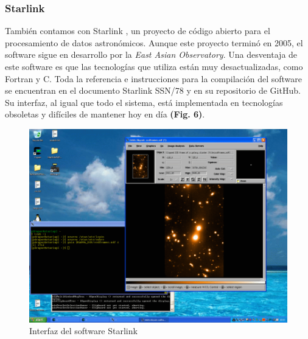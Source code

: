 \documentclass[10pt,twocolumn,a4paper]{opticajnl}
\begin{document}
\subsubsection*{Starlink}
También contamos con Starlink \cite{Berry_Starlink}, un proyecto de código abierto para el procesamiento de datos astronómicos. Aunque este proyecto terminó en 2005, el software sigue en desarrollo por la \textit{East Asian Observatory}. Una desventaja de este software es que las tecnologías que utiliza están muy desactualizadas, como Fortran y C. Toda la referencia e instrucciones para la compilación del software se encuentran en el documento Starlink SSN/78 y en su repositorio de GitHub. Su interfaz, al igual que todo el sistema, está implementada en tecnologías obsoletas y difíciles de mantener hoy en día \textbf{(Fig. 6)}.
\begin{figure}
	\centering
	\includegraphics[width=0.8\linewidth]{starlinkcap}
	\caption{Interfaz del software Starlink}
	\label{fig:starlinkcap}
\end{figure}
\end{document}
